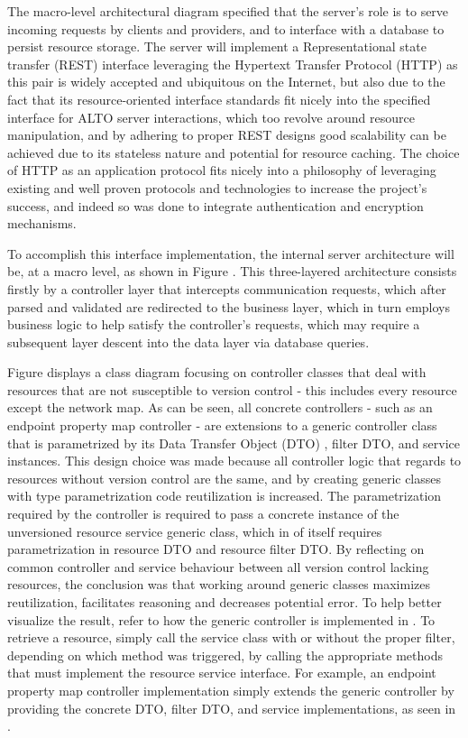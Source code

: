     The macro-level architectural diagram specified that the server's role is to serve incoming requests by clients and providers, and to interface with a database to persist resource storage.
    The server will implement a Representational state transfer (REST) interface leveraging the Hypertext Transfer Protocol (HTTP) as this pair is widely accepted and ubiquitous on the Internet, but also due to the fact that its resource-oriented interface standards fit nicely into the specified interface for ALTO server interactions, which too revolve around resource manipulation, and by adhering to proper REST designs good scalability can be achieved due to its stateless nature and potential for resource caching.
    The choice of HTTP as an application protocol fits nicely into a philosophy of leveraging existing and well proven protocols and technologies to increase the project's success, and indeed so was done to integrate authentication and encryption mechanisms.

    To accomplish this interface implementation, the internal server architecture will be, at a macro level, as shown in Figure \cite{fig:alto-server-architecture-macro}.
    This three-layered architecture consists firstly by a controller layer that intercepts communication requests, which after parsed and validated are redirected to the business layer, which in turn employs business logic to help satisfy the controller's requests, which may require a subsequent layer descent into the data layer via database queries.

    Figure \cite{fig:controller-unversioned-architecture} displays a class diagram focusing on controller classes that deal with resources that are not susceptible to version control - this includes every resource except the network map.
    As can be seen, all concrete controllers - such as an endpoint property map controller - are extensions to a generic controller class that is parametrized by its Data Transfer Object (DTO) , filter DTO, and service instances.
    This design choice was made because all controller logic that regards to resources without version control are the same, and by creating generic classes with type parametrization code reutilization is increased.
    The parametrization required by the controller is required to pass a concrete instance of the unversioned resource service generic class, which in of itself requires parametrization in resource DTO and resource filter DTO.
    By reflecting on common controller and service behaviour between all version control lacking resources, the conclusion was that working around generic classes maximizes reutilization, facilitates reasoning and decreases potential error.
    To help better visualize the result, refer to how the generic controller is implemented in \cite{lst:generic-controller}.
    To retrieve a resource, simply call the service class with or without the proper filter, depending on which method was triggered, by calling the appropriate methods that must implement the resource service interface.
    For example, an endpoint property map controller implementation simply extends the generic controller by providing the concrete DTO, filter DTO, and service implementations, as seen in \cite{lst:endpoint-property-map-controller}.

